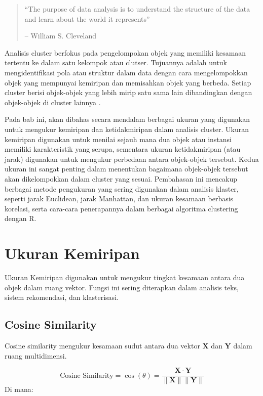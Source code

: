 \documentclass[
  oneside]{book}
\begin{document}
\begin{quote}
``The purpose of data analysis is to understand the structure of the data and learn about the world it represents''

-- William S. Cleveland
\end{quote}

Analisis cluster berfokus pada pengelompokan objek yang memiliki kesamaan tertentu ke dalam satu kelompok atau clutser. Tujuannya adalah untuk mengidentifikasi pola atau struktur dalam data dengan cara mengelompokkan objek yang mempunyai kemiripan dan memisahkan objek yang berbeda. Setiap cluster berisi objek-objek yang lebih mirip satu sama lain dibandingkan dengan objek-objek di cluster lainnya \citep{han2012mining}.

Pada bab ini, akan dibahas secara mendalam berbagai ukuran yang digunakan untuk mengukur kemiripan dan ketidakmiripan dalam analisis cluster. Ukuran kemiripan digunakan untuk menilai sejauh mana dua objek atau instansi memiliki karakteristik yang serupa, sementara ukuran ketidakmiripan (atau jarak) digunakan untuk mengukur perbedaan antara objek-objek tersebut. Kedua ukuran ini sangat penting dalam menentukan bagaimana objek-objek tersebut akan dikelompokkan dalam cluster yang sesuai. Pembahasan ini mencakup berbagai metode pengukuran yang sering digunakan dalam analisis klaster, seperti jarak Euclidean, jarak Manhattan, dan ukuran kesamaan berbasis korelasi, serta cara-cara penerapannya dalam berbagai algoritma clustering dengan R.

\section{Ukuran Kemiripan}\label{ukuran-kemiripan}

Ukuran Kemiripan digunakan untuk mengukur tingkat kesamaan antara dua objek dalam ruang vektor. Fungsi ini sering diterapkan dalam analisis teks, sistem rekomendasi, dan klasterisasi.

\subsection{\texorpdfstring{\textbf{Cosine Similarity}}{Cosine Similarity}}\label{cosine-similarity}

Cosine similarity mengukur kesamaan sudut antara dua vektor \(\mathbf{X}\) dan \(\mathbf{Y}\) dalam ruang multidimensi.

\[
\text{Cosine Similarity} = \cos(\theta) = \frac{\mathbf{X} \cdot \mathbf{Y}}{\|\mathbf{X}\| \|\mathbf{Y}\|}
\]Di mana:
\end{document}
